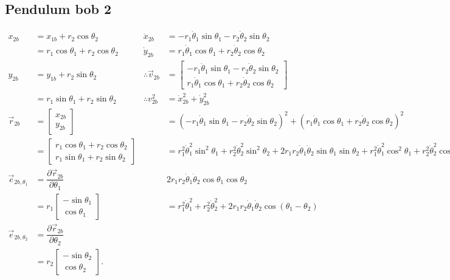 \documentclass[12pt,a4paper,portrait]{article}
\begin{document}
	\subsection{Pendulum bob 2}
	\begin{align*}
		x_{2b} &= x_{1b} + r_2 \cos{\theta_2} &\dot{x}_{2b} &= -r_1\dot{\theta}_1 \sin{\theta_1}-r_2\dot{\theta}_2 \sin{\theta_2}\\
		&= r_1 \cos{\theta_1} + r_2 \cos{\theta_2} & \dot{y}_{2b} &= r_1\dot{\theta}_1 \cos{\theta_1}+r_2\dot{\theta}_2 \cos{\theta_2} \\ 
		y_{2b} &= y_{1b} + r_2 \sin{\theta_2} & \therefore \vec{v}_{2b} &= \begin{bmatrix}
			-r_1\dot{\theta}_1 \sin{\theta_1}-r_2\dot{\theta}_2 \sin{\theta_2}\\
			r_1\dot{\theta}_1 \cos{\theta_1}+r_2\dot{\theta}_2 \cos{\theta_2}
		\end{bmatrix}\\
		&= r_1 \sin{\theta_1} + r_2 \sin{\theta_2} & \therefore v_{2b}^2 &= \dot{x}_{2b}^2 + \dot{y}_{2b}^2 \\
		\vec{r}_{2b}&= \begin{bmatrix}
			x_{2b} \\
			y_{2b}
		\end{bmatrix}& &= \left(-r_1\dot{\theta}_1 \sin{\theta_1}-r_2\dot{\theta}_2 \sin{\theta_2}\right)^2 + \left(r_1\dot{\theta}_1 \cos{\theta_1}+r_2\dot{\theta}_2 \cos{\theta_2}\right)^2 \\
		&= \begin{bmatrix}
			r_1 \cos{\theta_1} + r_2 \cos{\theta_2}\\
			r_1 \sin{\theta_1} + r_2 \sin{\theta_2}
		\end{bmatrix} & &= r_1^2 \dot{\theta}_1^2 \sin^2{\theta_1} + r_2^2 \dot{\theta}_2^2 \sin^2{\theta_2} + 2r_1 r_2 \dot{\theta}_1\dot{\theta}_2 \sin{\theta_1}\sin{\theta_2} + r_1^2 \dot{\theta}_1^2 \cos^2{\theta_1} + r_2^2 \dot{\theta}_2^2 \cos^2{\theta_2} + \\
		\vec{e}_{2b,\theta_1} &= \dfrac{\partial \vec{r}_{2b}}{\partial \theta_1} && 2r_1 r_2 \dot{\theta}_1 \dot{\theta}_2 \cos{\theta_1}\cos{\theta_2} \\
		&= r_1\begin{bmatrix}
			-\sin{\theta_1} \\
			\cos{\theta_1}
		\end{bmatrix}& &= r_1^2 \dot{\theta}_1^2 + r_2^2 \dot{\theta}_2^2 + 2r_1 r_2 \dot{\theta}_1 \dot{\theta}_2 \cos{\left(\theta_1-\theta_2\right)}\\
		\vec{e}_{2b,\theta_2} &= \dfrac{\partial \vec{r}_{2b}}{\partial \theta_2} \\
		&= r_2 \begin{bmatrix}
			-\sin{\theta_2} \\
			\cos{\theta_2}
		\end{bmatrix}.
	\end{align*}
	
\end{document}
